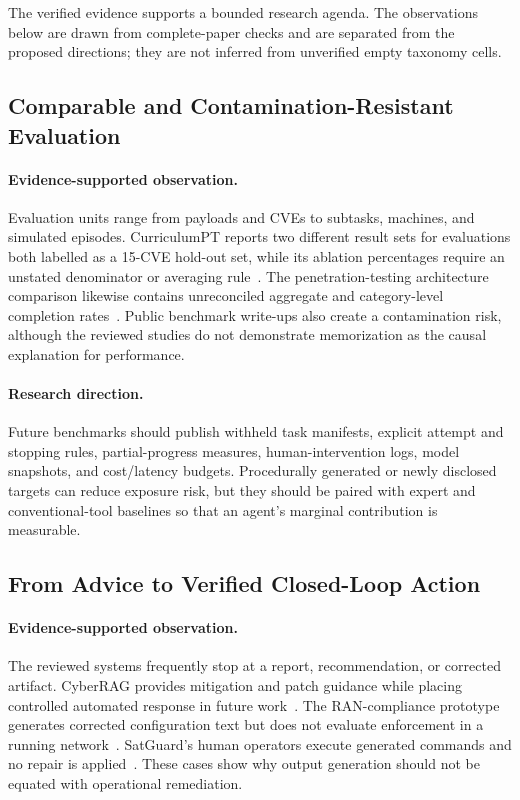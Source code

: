 The verified evidence supports a bounded research agenda. The observations below are drawn from complete-paper checks and are separated from the proposed directions; they are not inferred from unverified empty taxonomy cells.

\subsection{Comparable and Contamination-Resistant Evaluation}

\paragraph{Evidence-supported observation.}
Evaluation units range from payloads and CVEs to subtasks, machines, and simulated episodes. CurriculumPT reports two different result sets for evaluations both labelled as a 15-CVE hold-out set, while its ablation percentages require an unstated denominator or averaging rule~\cite{R0322_Wu_2025}. The penetration-testing architecture comparison likewise contains unreconciled aggregate and category-level completion rates~\cite{R0320_Huang_2025}. Public benchmark write-ups also create a contamination risk, although the reviewed studies do not demonstrate memorization as the causal explanation for performance.

\paragraph{Research direction.}
Future benchmarks should publish withheld task manifests, explicit attempt and stopping rules, partial-progress measures, human-intervention logs, model snapshots, and cost/latency budgets. Procedurally generated or newly disclosed targets can reduce exposure risk, but they should be paired with expert and conventional-tool baselines so that an agent's marginal contribution is measurable.

\subsection{From Advice to Verified Closed-Loop Action}

\paragraph{Evidence-supported observation.}
The reviewed systems frequently stop at a report, recommendation, or corrected artifact. CyberRAG provides mitigation and patch guidance while placing controlled automated response in future work~\cite{R0447_Blefari_2026}. The RAN-compliance prototype generates corrected configuration text but does not evaluate enforcement in a running network~\cite{R0340_Chatzimiltis_2026}. SatGuard's human operators execute generated commands and no repair is applied~\cite{R0384_Xiao_2025}. These cases show why output generation should not be equated with operational remediation.

